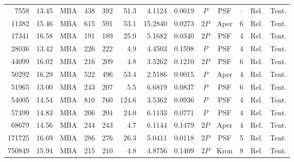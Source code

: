 \begin{table}[!p]
\begin{tabular}{r r c r r r r r c c r c c}
7558 & 13.45 & MBA & 438 & 392 & 51.3 & 4.1124 & 0.0019 & $P$ & PSF & -- & Rel. & Tent. \\
11382 & 15.46 & MBA & 615 & 591 & 53.1 & 15.2840 & 0.0273 & $2P$ & Aper & 6 & Rel. & Tent. \\
17341 & 16.58 & MBA & 191 & 189 & 25.9 & 5.1682 & 0.0340 & $2P$ & PSF & 4 & Rel. & Tent. \\
28036 & 13.42 & MBA & 226 & 222 & 4.9 & 4.4503 & 0.1598 & $P$ & PSF & 4 & Rel. & Tent. \\
44099 & 16.02 & MBA & 216 & 209 & 4.8 & 3.5262 & 0.1210 & $2P$ & PSF & 6 & Rel. & Tent. \\
50292 & 16.29 & MBA & 522 & 496 & 53.4 & 2.5186 & 0.0015 & $P$ & Aper & 4 & Rel. & Tent. \\
51965 & 13.00 & MBA & 243 & 207 & 5.5 & 6.6819 & 0.0837 & $P$ & PSF & 6 & Rel. & Tent. \\
54005 & 14.54 & MBA & 810 & 760 & 124.6 & 3.5362 & 0.0936 & $P$ & PSF & 4 & Rel. & Tent. \\
57499 & 14.83 & MBA & 206 & 204 & 24.0 & 6.1133 & 0.0771 & $P$ & PSF & 4 & Rel. & Tent. \\
68679 & 14.56 & MBA & 244 & 243 & 4.7 & 6.1144 & 0.1479 & $2P$ & Aper & 4 & Rel. & Tent. \\
171725 & 16.69 & MBA & 286 & 276 & 26.3 & 5.0411 & 0.0118 & $2P$ & PSF & 5 & Rel. & Tent. \\
750849 & 15.94 & MBA & 215 & 210 & 4.8 & 4.8756 & 0.1409 & $2P$ & Kron & 8 & Rel. & Tent. \\
\bottomrule
\end{tabular}
\end{table}
